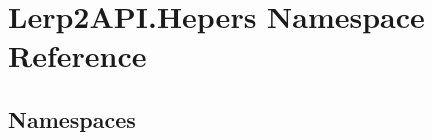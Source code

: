\hypertarget{namespace_lerp2_a_p_i_1_1_hepers}{}\section{Lerp2\+A\+P\+I.\+Hepers Namespace Reference}
\label{namespace_lerp2_a_p_i_1_1_hepers}
\subsection*{Namespaces}
\begin{DoxyCompactItemize}
\end{DoxyCompactItemize}
